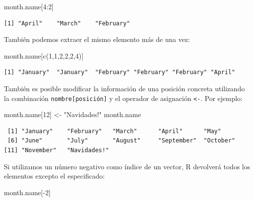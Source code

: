 \documentclass[
  letterpaper,
  DIV=11,
  numbers=noendperiod]{scrreprt}
\newenvironment{Shaded}{\begin{snugshade}}{\end{snugshade}}
\newcommand{\DecValTok}[1]{\textcolor[rgb]{0.68,0.00,0.00}{#1}}
\newcommand{\FunctionTok}[1]{\textcolor[rgb]{0.28,0.35,0.67}{#1}}
\newcommand{\NormalTok}[1]{\textcolor[rgb]{0.00,0.23,0.31}{#1}}
\newcommand{\OtherTok}[1]{\textcolor[rgb]{0.00,0.23,0.31}{#1}}
\newcommand{\SpecialCharTok}[1]{\textcolor[rgb]{0.37,0.37,0.37}{#1}}
\newcommand{\StringTok}[1]{\textcolor[rgb]{0.13,0.47,0.30}{#1}}
\begin{document}
\begin{Shaded}
\begin{Highlighting}[]
\NormalTok{month.name[}\DecValTok{4}\SpecialCharTok{:}\DecValTok{2}\NormalTok{]}
\end{Highlighting}
\end{Shaded}

\begin{verbatim}
[1] "April"    "March"    "February"
\end{verbatim}

También podemos extraer el mismo elemento más de una vez:

\begin{Shaded}
\begin{Highlighting}[]
\NormalTok{month.name[}\FunctionTok{c}\NormalTok{(}\DecValTok{1}\NormalTok{,}\DecValTok{1}\NormalTok{,}\DecValTok{2}\NormalTok{,}\DecValTok{2}\NormalTok{,}\DecValTok{2}\NormalTok{,}\DecValTok{4}\NormalTok{)]}
\end{Highlighting}
\end{Shaded}

\begin{verbatim}
[1] "January"  "January"  "February" "February" "February" "April"   
\end{verbatim}

También es posible modificar la información de una posición concreta
utilizando la combinación \texttt{nombre{[}posición{]}} y el operador de
asignación \texttt{\textless{}-}. Por ejemplo:

\begin{Shaded}
\begin{Highlighting}[]
\NormalTok{month.name[}\DecValTok{12}\NormalTok{] }\OtherTok{\textless{}{-}} \StringTok{"Navidades!"}
\NormalTok{month.name}
\end{Highlighting}
\end{Shaded}

\begin{verbatim}
 [1] "January"    "February"   "March"      "April"      "May"       
 [6] "June"       "July"       "August"     "September"  "October"   
[11] "November"   "Navidades!"
\end{verbatim}

Si utilizamos un número negativo como índice de un vector, R devolverá
todos los elementos excepto el especificado:

\begin{Shaded}
\begin{Highlighting}[]
\NormalTok{month.name[}\SpecialCharTok{{-}}\DecValTok{2}\NormalTok{]}
\end{Highlighting}
\end{Shaded}
\end{document}
